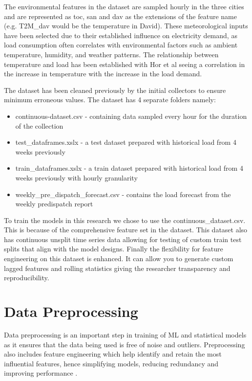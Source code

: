 The environmental features in the dataset are sampled hourly in the three cities and are represented as toc, san and dav as the extensions of the feature name (e.g. T2M\_dav would be the temperature in David). These meteorological inputs have been selected due to their established influence on electricity demand, as load consumption often correlates with environmental factors such as ambient temperature, humidity, and weather patterns. The relationship between temperature and load has been established with Hor et al \cite{hor2005analyzing} seeing a correlation in the increase in temperature with the increase in the load demand.

The dataset has been cleaned previously by the  initial collectors to ensure minimum erroneous values. The dataset has 4 separate folders namely:
\begin{itemize}
	\item continuous-dataset.csv - containing data sampled every hour for the duration of the collection
	\item test\_dataframes.xslx - a test dataset prepared with historical load from 4 weeks previously \cite{dataset}
	\item train\_dataframes.xslx - a train dataset prepared with historical load from 4 weeks previously with hourly granularity \cite{dataset}
	\item weekly\_pre\_dispatch\_forecast.csv - contains the load forecast from the weekly predispatch report
\end{itemize}

To train the models in this research we chose to use the continuous\_dataset.csv. This is  because of the comprehensive feature set in the dataset. This dataset also has continuous unsplit time series data allowing for testing of custom train test splits that align with the model designs. Finally the flexibility for feature engineering on this dataset is enhanced. It can allow you to generate custom lagged features and rolling statistics giving the researcher transparency and reproducibility.

\section{Data Preprocessing \label{sec:datapreprocessing}}

Data preprocessing is an important step in training of ML and statistical models as it ensures that the data being used is free of noise and outliers. Preprocessing also includes feature engineering which help identify and retain the most influential features, hence simplifying models, reducing redundancy and improving performance \cite{gao2021cooling}.

